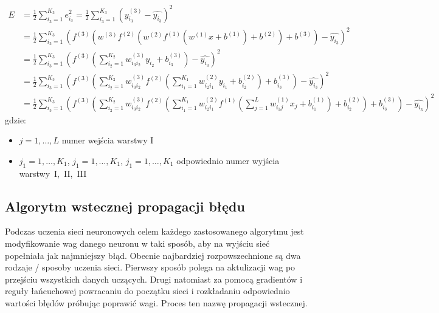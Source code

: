 \documentclass[12pt,twoside]{article}
\begin{document}
\begin{equation}
	\begin{aligned}
		E &= \frac{1}{2} \sum_{i_3=1}^{K_3}e_{i_3}^2
		= \frac{1}{2} \sum_{i_3=1}^{K_3}(y_{i_3}^{(3)} - \hat{y_{i_3}})^2\\
		&= \frac{1}{2} \sum_{i_3=1}^{K_3}(f^{(3)}(w^{(3)}f^{(2)}(w^{(2)}f^{(1)}(w^{(1)}x+b^{(1)})+b^{(2)})+b^{(3)}) - \hat{y_{i_3}})^2\\
		&= \frac{1}{2}\sum_{i_3=1}^{K_3}(f^{(3)}(\sum_{i_2=1}^{K_2}w_{i_3i_2}^{(3)}y_{i_2}+b_{i_3}^{(3)}) - \hat{y_{i_3}})^2\\
		&= \frac{1}{2}\sum_{i_3=1}^{K_3}(
		f^{(3)}(\sum_{i_2=1}^{K_2}w_{i_3i_2}^{(3)}f^{(2)}(
		\sum_{i_1=1}^{K_1}w_{i_2i_1}^{(2)}y_{i_1}+b_{i_2}^{(2)}
		)+b_{i_3}^{(3)}) - \hat{y_{i_3}})^2\\
		&= \frac{1}{2}\sum_{i_3=1}^{K_3}(
		f^{(3)}(\sum_{i_2=1}^{K_2}w_{i_3i_2}^{(3)}f^{(2)}(
		\sum_{i_1=1}^{K_1}w_{i_2i_1}^{(2)}
		f^{(1)}(\sum_{j=1}^{L}w_{i_1j}^{(1)}x_j+b_{i_1}^{(1)})
		+b_{i_2}^{(2)}
		)+b_{i_3}^{(3)})
		- \hat{y_{i_3}})^2
	\end{aligned}
	\label{Eq:funkcja_celu}
\end{equation}
gdzie:
\begin{itemize}
	\setlength\itemsep{0em}
	\setlength{\parskip}{0pt}
	\item $j = 1,\dots,L$ numer wejścia warstwy I
	\item $j_1=1,\dots,K_1$, $j_1=1,\dots,K_1$, $j_1=1,\dots,K_1$ odpowiednio numer wyjścia warstwy~I,~II,~III
\end{itemize}
\newpage
\subsection{Algorytm wstecznej propagacji błędu}
Podczas uczenia sieci neuronowych celem każdego zastosowanego algorytmu jest modyfikowanie wag danego neuronu w taki sposób, aby na wyjściu sieć popełniała jak najmniejszy błąd. Obecnie najbardziej rozpowszechnione są dwa rodzaje / sposoby uczenia sieci. Pierwszy sposób polega na aktulizacji wag po przejściu wszystkich danych uczących. Drugi natomiast za pomocą gradientów i reguły łańcuchowej
powracaniu do początku sieci i rozkładaniu odpowiednio wartości błędów próbując poprawić wagi. Proces ten nazwę propagacji wstecznej.
\end{document}
